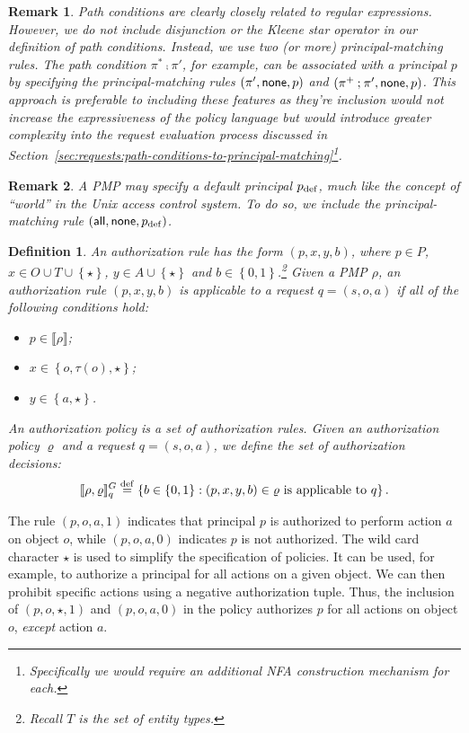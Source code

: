 \documentclass{article}
\newcommand{\semantics}[1]{\llbracket #1 \rrbracket}
\newtheorem{definition}{Definition}
\newtheorem{remark}{Remark}
\newcommand{\set}[1]{\ensuremath{\left\{#1\right\}}} \newcommand{\setO}[1]{\ensuremath{\left\{#1\right.}} \newcommand{\setC}[1]{\ensuremath{\left.#1\right\}}} \newcommand{\setN}[1]{\ensuremath{\left.#1\right.}} \newcommand{\sett}[1]{\ensuremath{\left\{\textit{#1}\right\}}} \newcommand{\tuple}[1]{\ensuremath{\left(#1\right)}} \newcommand{\tuplet}[1]{\ensuremath{\left(\textit{#1}\right)}} \newcommand{\card}[1]{\left| #1 \right|}
\begin{document}
\begin{remark}
 Path conditions are clearly closely related to regular expressions.
 However, we do not include disjunction or the Kleene star operator in our definition of path conditions.
 Instead, we use two (or more) principal-matching rules.
 The path condition $\pi^* \comp \pi'$, for example, can be associated with a principal $p$ by specifying the principal-matching rules $(\pi',\mathsf{none},p)$ and $(\pi^+ \mathbin{;} \pi',\mathsf{none},p)$.
 This approach is preferable to including these features as they're inclusion would not increase the expressiveness of the policy language but would introduce greater complexity into the request evaluation process discussed in Section~\ref{sec:requests:path-conditions-to-principal-matching}\footnote{Specifically we would require an additional NFA construction mechanism for each.}.
\end{remark}

\begin{remark}
 A PMP may specify a default principal $p_{\rm def}$, much like the concept of ``world'' in the Unix access control system.
 To do so, we include the principal-matching rule $(\mathsf{all},\mathsf{none},p_{\rm def})$.
\end{remark}

\begin{definition}\label{def:auth-decisions}
  An \emph{authorization rule} has the form $(p,x,y,b)$, where $p \in P$, $x \in O \cup T \cup \set{\star}$, $y \in A \cup \set{\star}$ and $b \in \set{0,1}$.\footnote{Recall $T$ is the set of entity types.}
  Given a PMP $\rho$, an authorization rule $(p,x,y,b)$ is applicable to a request $q = (s,o,a)$ if all of the following conditions hold:
  \begin{itemize}
   \item $p \in \semantics{\rho}$;
   \item $x \in \set{o,\tau(o),\star}$;
   \item $y \in \set{a,\star}$.
  \end{itemize}
    An \emph{authorization policy} is a set of authorization rules.
    Given an authorization policy $\varrho$
    and a request $q = (s,o,a)$, we define the set of \emph{authorization decisions}:
    \[
    \semantics{\rho,\varrho}^G_q \stackrel{\rm def}{=} \set{b \in \set{0,1} : (p,x,y,b) \in \varrho\ \text{is applicable to}\ q}.
    \]
\end{definition}

The rule $(p,o,a,1)$ indicates that principal $p$ is authorized to perform action $a$ on object $o$, while $(p,o,a,0)$ indicates $p$ is not authorized.
The wild card character $\star$ is used to simplify the specification of policies.
It can be used, for example, to authorize a principal for all actions on a given object.
We can then prohibit specific actions using a negative authorization tuple.
Thus, the inclusion of $(p,o,\star,1)$ and $(p,o,a,0)$ in the policy authorizes $p$ for all actions on object $o$, \emph{except} action $a$.
\end{document}
